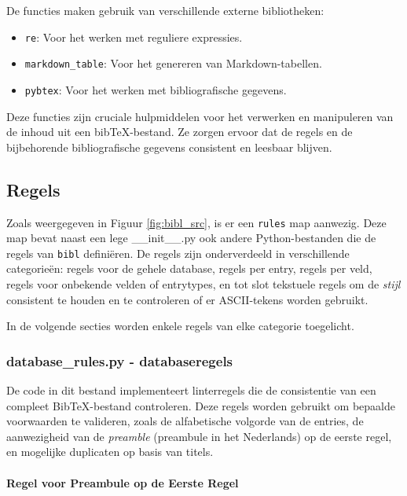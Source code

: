 De functies maken gebruik van verschillende externe bibliotheken:
\begin{itemize}
    \item \texttt{re}: Voor het werken met reguliere expressies.
    \item \texttt{markdown\_table}: Voor het genereren van Markdown-tabellen.
    \item \texttt{pybtex}: Voor het werken met bibliografische gegevens.
\end{itemize}

Deze functies zijn cruciale hulpmiddelen voor het verwerken en manipuleren van de inhoud uit een bibTeX-bestand. Ze zorgen ervoor dat de regels en de bijbehorende bibliografische gegevens consistent en leesbaar blijven.


\subsection{Regels}
Zoals weergegeven in Figuur \ref{fig:bibl_src}, is er een \texttt{rules} map aanwezig. Deze map bevat naast een lege \_\_init\_\_.py ook andere Python-bestanden die de regels van \texttt{bibl} definiëren. De regels zijn onderverdeeld in verschillende categorieën: regels voor de gehele database, regels per entry, regels per veld, regels voor onbekende velden of entrytypes, en tot slot tekstuele regels om de \emph{stijl} consistent te houden en te controleren of er ASCII-tekens worden gebruikt.

In de volgende secties worden enkele regels van elke categorie toegelicht.


\subsubsection{database\_rules.py - databaseregels}

De code in dit bestand implementeert linterregels die de consistentie van een compleet BibTeX-bestand controleren. Deze regels worden gebruikt om bepaalde voorwaarden te valideren, zoals de alfabetische volgorde van de entries, de aanwezigheid van de \emph{preamble} (preambule in het Nederlands) op de eerste regel, en mogelijke duplicaten op basis van titels.

\paragraph{Regel voor Preambule op de Eerste Regel}

